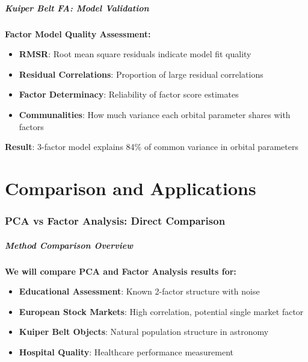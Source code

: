 \documentclass[aspectratio=169]{beamer}
\begin{document}
\begin{frame}
    \frametitle{Kuiper Belt FA: Model Validation}
    \textbf{Factor Model Quality Assessment:}
    \begin{itemize}
        \item \textbf{RMSR}: Root mean square residuals indicate model fit quality \pause
        \item \textbf{Residual Correlations}: Proportion of large residual correlations \pause
        \item \textbf{Factor Determinacy}: Reliability of factor score estimates \pause
        \item \textbf{Communalities}: How much variance each orbital parameter shares with factors \pause
    \end{itemize}
    \vspace{6pt}
    \textbf{Result}: 3-factor model explains 84\% of common variance in orbital parameters
\end{frame}


\part{Comparison and Applications}

\begin{frame}
    \partpage
\end{frame}

\section{PCA vs Factor Analysis: Direct Comparison}

\begin{frame}
    \frametitle{Method Comparison Overview}
    \textbf{We will compare PCA and Factor Analysis results for:}
    \begin{itemize}
        \item \textbf{Educational Assessment}: Known 2-factor structure with noise
        \item \textbf{European Stock Markets}: High correlation, potential single market factor  
        \item \textbf{Kuiper Belt Objects}: Natural population structure in astronomy
        \item \textbf{Hospital Quality}: Healthcare performance measurement
    \end{itemize}
\end{frame}
\end{document}
